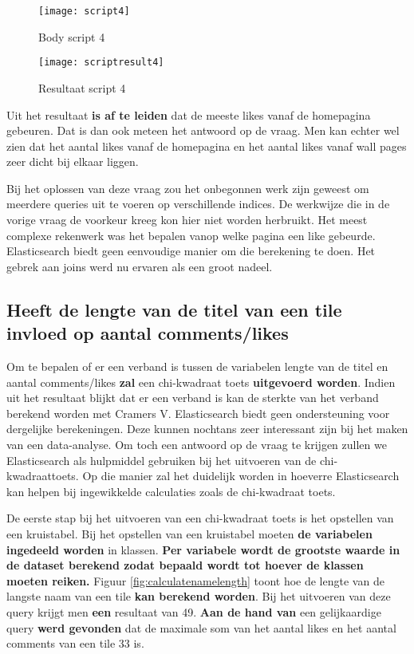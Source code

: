 \begin{figure}
	\centering
	\texttt{[image: script4]}
	\caption{Body script 4}
	\label{fig:script4}
\end{figure}

\begin{figure}
	\centering
	\texttt{[image: scriptresult4]}
	\caption{Resultaat script 4}
	\label{fig:scriptresult4}
\end{figure}

Uit het resultaat \textbf{is af te leiden} dat de meeste likes vanaf de homepagina gebeuren. Dat is dan ook meteen het antwoord op de vraag. Men kan echter wel zien dat het aantal likes vanaf de homepagina en het aantal likes vanaf wall pages zeer dicht bij elkaar liggen. 

Bij het oplossen van deze vraag zou het onbegonnen werk zijn geweest om meerdere queries uit te voeren op verschillende indices. De werkwijze die in de vorige vraag de voorkeur kreeg kon hier niet worden herbruikt. Het meest complexe rekenwerk was het bepalen vanop welke pagina een like gebeurde. Elasticsearch biedt geen eenvoudige manier om die berekening te doen. Het gebrek aan joins werd nu ervaren als een groot nadeel.

\subsection{Heeft de lengte van de titel van een tile invloed op aantal comments/likes}

Om te bepalen of er een verband is tussen de variabelen lengte van de titel en aantal comments/likes \textbf{zal} een chi-kwadraat toets \textbf{uitgevoerd worden}. Indien uit het resultaat blijkt dat er een verband is kan de sterkte van het verband berekend worden met Cramers V. Elasticsearch biedt geen ondersteuning voor dergelijke berekeningen. Deze kunnen nochtans zeer interessant zijn bij het maken van een data-analyse. Om toch een antwoord op de vraag te krijgen zullen we Elasticsearch als hulpmiddel gebruiken bij het uitvoeren van de chi-kwadraattoets. Op die manier zal het duidelijk worden in hoeverre Elasticsearch kan helpen bij ingewikkelde calculaties zoals de chi-kwadraat toets. 

De eerste stap bij het uitvoeren van een chi-kwadraat toets is het opstellen van een kruistabel. Bij het opstellen van een kruistabel moeten \textbf{de variabelen ingedeeld worden} in klassen. \textbf{Per variabele wordt de grootste waarde in de dataset berekend zodat bepaald wordt tot hoever de klassen moeten reiken.} Figuur \ref{fig:calculatenamelength} toont hoe de lengte van de langste naam van een tile \textbf{kan berekend worden}. Bij het uitvoeren van deze query krijgt men \textbf{een} resultaat van 49. \textbf{Aan de hand van} een gelijkaardige query \textbf{werd gevonden} dat de maximale som van het aantal likes en het aantal comments van een tile 33 is.

